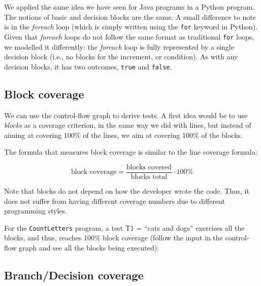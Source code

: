 We applied the same idea we have seen for Java programs in a Python
program. The notions of basic and decision blocks are the same. A small
difference to note is in the \emph{foreach} loop (which is simply
written using the \texttt{for} keyword in Python). Given that
\emph{foreach} loops do not follow the same format as traditional
\texttt{for} loops, we modelled it differently: the \emph{foreach} loop
is fully represented by a single decision block (i.e., no blocks for the
increment, or condition). As with any decision blocks, it has two
outcomes, \texttt{true} and \texttt{false}.

\hypertarget{block-coverage}{%
\subsection{Block coverage}\label{block-coverage}}

We can use the control-flow graph to derive tests. A first idea would be
to use \emph{blocks} as a coverage criterion, in the same way we did
with lines, but instead of aiming at covering 100\% of the lines, we aim
at covering 100\% of the blocks.

The formula that measures block coverage is similar to the line coverage
formula:

\[\text{block coverage} = \frac{\text{blocks covered}}{\text{blocks total}} \cdot 100\%\]

Note that blocks do not depend on how the developer wrote the code.
Thus, it does not suffer from having different coverage numbers due to
different programming styles.

For the \texttt{CountLetters} program, a test T1 = ``cats and dogs''
exercises all the blocks, and thus, reaches 100\% block coverage (follow
the input in the control-flow graph and see all the blocks being
executed):

\begin{Shaded}
\begin{Highlighting}[]
 \NormalTok{() \{}
   \NormalTok{(}\NormalTok{);}
  \NormalTok{(}
\NormalTok{\}}
\end{Highlighting}
\end{Shaded}

\hypertarget{branchdecision-coverage}{%
\subsection{Branch/Decision coverage}\label{branchdecision-coverage}}

